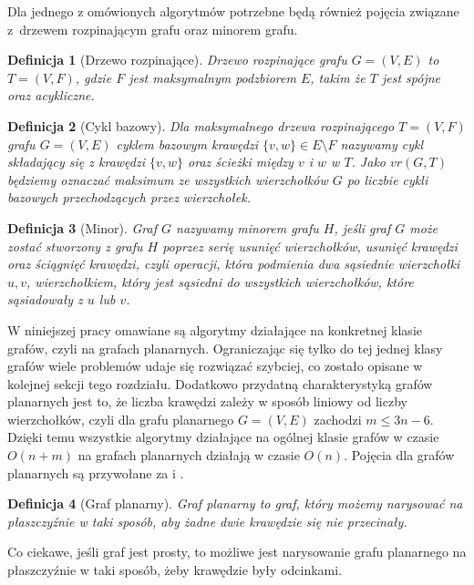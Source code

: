\documentclass[twoside,a4paper,12pt]{report} %
\theoremstyle{break}
\newtheorem{definition}{Definicja}[section]
\begin{document}
Dla jednego z omówionych algorytmów potrzebne będą również pojęcia związane z~drzewem rozpinającym grafu oraz minorem grafu.

\begin{definition}[Drzewo rozpinające]
\emph{Drzewo rozpinające} grafu $G=(V,E)$ to $T=(V,F)$, gdzie $F$ jest maksymalnym podzbiorem $E$, takim że $T$ jest spójne oraz acykliczne. 
\end{definition}

\begin{definition}[Cykl bazowy]
Dla maksymalnego drzewa rozpinającego $T=(V,F)$ grafu $G=(V,E)$ \emph{cyklem bazowym} krawędzi $\{v,w\} \in E \setminus F$ nazywamy cykl składający się z krawędzi $\{v,w\}$ oraz ścieżki między $v$ i $w$ w $T$. Jako $vr(G,T)$ będziemy oznaczać maksimum ze wszystkich wierzchołków $G$ po liczbie cykli bazowych przechodzących przez wierzchołek.
\end{definition}

\begin{definition}[Minor]
Graf $G$ nazywamy minorem grafu $H$, jeśli graf $G$ może zostać stworzony z grafu $H$ poprzez serię usunięć wierzchołków, usunięć krawędzi oraz ściągnięć krawędzi, czyli operacji, która podmienia dwa sąsiednie wierzchołki $u,v$, wierzchołkiem, który jest sąsiedni do wszystkich wierzchołków, które sąsiadowały z $u$ lub $v$.
\end{definition}

W niniejszej pracy omawiane są algorytmy działające na konkretnej klasie grafów, czyli na grafach planarnych. Ograniczając się tylko do tej jednej klasy grafów wiele problemów udaje się rozwiązać szybciej, co zostało opisane w kolejnej sekcji tego rozdziału. Dodatkowo przydatną charakterystyką grafów planarnych jest to, że liczba krawędzi zależy w sposób liniowy od liczby wierzchołków, czyli dla grafu planarnego $G=(V,E)$ zachodzi $m \le 3n - 6$. Dzięki temu wszystkie algorytmy działające na ogólnej klasie grafów w czasie $O(n+m)$ na grafach planarnych działają w czasie $O(n)$. Pojęcia dla grafów planarnych są przywołane za \cite{math_dict} i \cite{emb}.

\begin{definition}[Graf planarny]
Graf planarny to graf, który możemy narysować na płaszczyźnie w taki sposób, aby żadne dwie krawędzie się nie przecinały.
\end{definition}
Co ciekawe, jeśli graf jest prosty, to możliwe jest narysowanie grafu planarnego na płaszczyźnie w taki sposób, żeby krawędzie były odcinkami.
\end{document}
